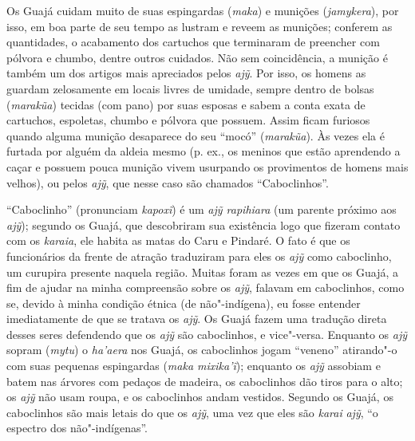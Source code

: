 Os Guajá cuidam muito de suas espingardas (\emph{maka}) e munições
(\emph{jamykera}), por isso, em boa parte de seu tempo as lustram e
reveem as munições; conferem as quantidades, o acabamento dos cartuchos
que terminaram de preencher com pólvora e chumbo, dentre outros
cuidados. Não sem coincidência, a munição é também um dos artigos mais
apreciados pelos \emph{ajỹ}. Por isso, os homens as guardam zelosamente
em locais livres de umidade, sempre dentro de bolsas (\emph{marakũa})
tecidas (com pano) por suas esposas e sabem a conta exata de cartuchos,
espoletas, chumbo e pólvora que possuem. Assim ficam furiosos quando
alguma munição desaparece do seu ``mocó'' (\emph{marakũa}). Às vezes ela é
furtada por alguém da aldeia mesmo (p. ex., os meninos que estão
aprendendo a caçar e possuem pouca munição vivem usurpando os
provimentos de homens mais velhos), ou pelos \emph{ajỹ}, que nesse caso
são chamados ``Caboclinhos''.

``Caboclinho'' (pronunciam \emph{kapoxĩ}) é um \emph{ajỹ rapihiara} (um
parente próximo aos \emph{ajỹ}); segundo os Guajá, que descobriram sua
existência logo que fizeram contato com os \emph{karaia}, ele habita as
matas do Caru e Pindaré. O fato é que os funcionários da frente de
atração traduziram para eles os \emph{ajỹ} como caboclinho, um curupira
presente naquela região. Muitas foram as vezes em que os Guajá, a fim de
ajudar na minha compreensão sobre os \emph{ajỹ}, falavam em caboclinhos,
como se, devido à minha condição étnica (de não"-indígena), eu fosse
entender imediatamente de que se tratava os \emph{ajỹ}. Os Guajá fazem
uma tradução direta desses seres defendendo que os \emph{ajỹ} são
caboclinhos, e vice"-versa. Enquanto os \emph{ajỹ} sopram (\emph{mytu}) o
\emph{ha'aera} nos Guajá, os caboclinhos jogam ``veneno'' atirando"-o com
suas pequenas espingardas (\emph{maka mixika'ĩ}); enquanto os \emph{ajỹ}
assobiam e batem nas árvores com pedaços de madeira, os caboclinhos dão
tiros para o alto; os \emph{ajỹ} não usam roupa, e os caboclinhos andam
vestidos. Segundo os Guajá, os caboclinhos são mais letais do que os
\emph{ajỹ}, uma vez que eles são \emph{karai} \emph{ajỹ}, ``o espectro
dos não"-indígenas''.


